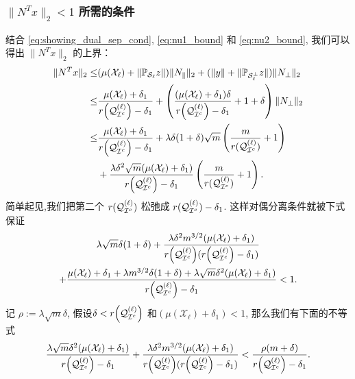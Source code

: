 \subsubsection{ \(\|N^T x\|_2<1\) 所需的条件}
结合 \eqref{eq:showing_dual_sep_cond},  \eqref{eq:nu1_bound} 和 \eqref{eq:nu2_bound},    
我们可以得出 \(\|N^T x\|_2\) 的上界：
\begin{align*}
  \|N^T x\|_2 \leq& (\mu(\mathcal{X}_{\ell})+\|\mathbb{P}_{\mathcal{S}_{\ell}}z\|) 
  \|N_{\parallel}\|_2+(\|y\|+\|\mathbb{P}_{\mathcal{S}_{\ell}^{\perp}}z\|)\|N_{\perp}\|_2\\
  \leq&\frac{\mu(\mathcal{X}_\ell)+\delta_1}{r{\left(\mathcal{Q}_{\mathcal{I}^c}^{(\ell)}\right)}-\delta_1}
  +\left(\frac{(\mu(\mathcal{X}_{\ell})+\delta_1)\delta}{r{\left( \mathcal{Q}_{\mathcal{I}^c}^{(\ell)}\right)}-\delta_1}+1+\delta\right)
  \|N_{\perp}\|_2\\
  \leq& \frac{\mu(\mathcal{X}_{\ell})+\delta_1}{r{\left( \mathcal{Q}_{\mathcal{I}^c}^{(\ell)}\right)}-\delta_1} +
  \lambda\delta(1+\delta)\sqrt{m}
  \left(\frac{m}{r(\mathcal{Q}_{\mathcal{I}^c}^{(\ell)})}+1\right) \\
  &+ \frac{\lambda\delta^2\sqrt{m}(\mu(\mathcal{X}_{\ell})+\delta_1)}
  {r{\left( \mathcal{Q}_{\mathcal{I}^c}^{(\ell)}\right)}-\delta_1}\left(\frac{m}{r(\mathcal{Q}_{\mathcal{I}^c}^{(\ell)})}+1\right).
\end{align*}
简单起见,我们把第二个 \(r(\mathcal{Q}_{\mathcal{I}^c}^{(\ell)})\) 松弛成 \(r(\mathcal{Q}_{\mathcal{I}^c}^{(\ell)})-\delta_1\).
这样对偶分离条件就被下式保证
\begin{multline}\label{eq:dual_cond_full}
   \lambda\sqrt{m}\delta(1+\delta)
  +\frac{\lambda\delta^2 m^{3/2}(\mu(\mathcal{X}_{\ell})+\delta_1)}
  {r{\left( \mathcal{Q}_{\mathcal{I}^c}^{(\ell)}\right)}(r{\left(
    \mathcal{Q}_{\mathcal{I}^c}^{(\ell)}\right)}-\delta_1)} \\
  +\frac{\mu(\mathcal{X}_{\ell})+\delta_1 +\lambda m^{3/2}\delta(1+\delta)+
  \lambda\sqrt{m}\delta^2(\mu(\mathcal{X}_{\ell})+\delta_1)}
  {r{\left( \mathcal{Q}_{\mathcal{I}^c}^{(\ell)}\right)}-\delta_1}<1.
\end{multline}
记 \(\rho:=\lambda\sqrt{m}\delta\), 假设\(\delta<r{\left(\mathcal{Q}_{\mathcal{I}^c}^{(\ell)}\right)}\)
和\((\mu(\mathcal{X}_{\ell})+\delta_1)<1\), 那么我们有下面的不等式
\begin{align*}
  \frac{\lambda\sqrt{m}\delta^2(\mu(\mathcal{X}_{\ell})+\delta_1)}
  {r{\left( \mathcal{Q}_{\mathcal{I}^c}^{(\ell)}\right)}-\delta_1}
  +\frac{\lambda\delta^2 m^{3/2}(\mu(\mathcal{X}_{\ell})+\delta_1)}
  {r{\left( \mathcal{Q}_{\mathcal{I}^c}^{(\ell)}\right)}(r{\left( \mathcal{Q}_{\mathcal{I}^c}^{(\ell)}\right)}-\delta_1)}
  < \frac{\rho (m+\delta)}{r{\left( \mathcal{Q}_{\mathcal{I}^c}^{(\ell)}\right)}-\delta_1}.
\end{align*}
